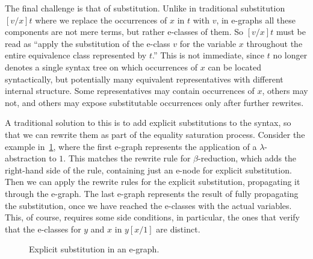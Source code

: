 \begin{example}
The final challenge is that of substitution.
Unlike in traditional substitution $[v / x]t$ where we replace the occurrences of $x$ in $t$ with $v$, in e-graphs all these components are not mere terms, but rather e-classes of them.
So $[v/x]t$ must be read as \enquote{apply the substitution of the e-class $v$ for the variable $x$ throughout the entire equivalence class represented by $t$.} 
This is not immediate, since $t$ no longer denotes a single syntax tree on which occurrences of $x$ can be located syntactically, but potentially many equivalent representatives with different internal structure. 
Some representatives may contain occurrences of $x$, others may not, and others may expose substitutable occurrences only after further rewrites.

A traditional solution to this is to add explicit substitutions to the syntax, so that we can rewrite them as part of the equality saturation process.
Consider the example in~\cref{fig:explicit-substitution-egg}, where the first e-graph represents the application of a $\lambda$-abstraction to $1$.
This matches the rewrite rule for $\beta$-reduction, which adds the right-hand side of the rule, containing just an e-node for explicit substitution.
Then we can apply the rewrite rules for the explicit substitution, propagating it through the e-graph.
The last e-graph represents the result of fully propagating the substitution, once we have reached the e-classes with the actual variables.
This, of course, requires some side conditions, in particular, the ones that verify that the e-classes for $y$ and $x$ in $y[x/1]$ are distinct.
\end{example}

\begin{figure}
    \centering
    \caption{Explicit substitution in an e-graph.}
    \label{fig:explicit-substitution-egg}
\end{figure}

